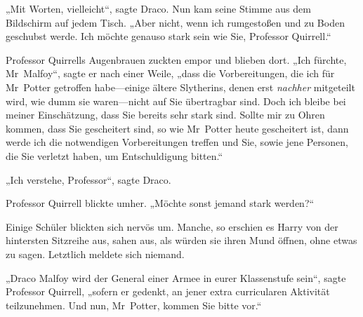 „Mit Worten, vielleicht“, sagte Draco. Nun kam seine Stimme aus dem Bildschirm auf jedem Tisch. „Aber nicht, wenn ich rumgestoßen und zu Boden geschubst werde. Ich möchte genauso stark sein wie Sie, Professor Quirrell.“

Professor Quirrells Augenbrauen zuckten empor und blieben dort. „Ich fürchte, Mr~Malfoy“, sagte er nach einer Weile, „dass die Vorbereitungen, die ich für Mr~Potter getroffen habe—einige ältere Slytherins, denen erst \emph{nachher} mitgeteilt wird, wie dumm sie waren—nicht auf Sie übertragbar sind. Doch ich bleibe bei meiner Einschätzung, dass Sie bereits sehr stark sind. Sollte mir zu Ohren kommen, dass Sie gescheitert sind, so wie Mr~Potter heute gescheitert ist, dann werde ich die notwendigen Vorbereitungen treffen und Sie, sowie jene Personen, die Sie verletzt haben, um Entschuldigung bitten.“

„Ich verstehe, Professor“, sagte Draco.

Professor Quirrell blickte umher. „Möchte sonst jemand stark werden?“

Einige Schüler blickten sich nervös um. Manche, so erschien es Harry von der hintersten Sitzreihe aus, sahen aus, als würden sie ihren Mund öffnen, ohne etwas zu sagen. Letztlich meldete sich niemand.

„Draco Malfoy wird der General einer Armee in eurer Klassenstufe sein“, sagte Professor Quirrell, „sofern er gedenkt, an jener extra curricularen Aktivität teilzunehmen. Und nun, Mr~Potter, kommen Sie bitte vor.“

